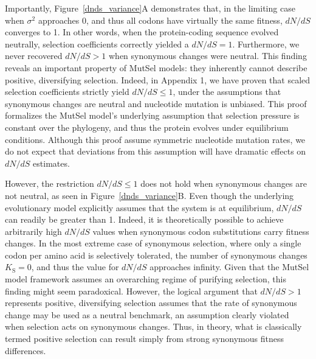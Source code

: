 \documentclass[11pt]{article}
\begin{document}
Importantly, Figure~\ref{dnds_variance}A demonstrates that, in the limiting case when $\sigma^2$ approaches 0, and thus all codons have virtually the same fitness, $dN/dS$ converges to 1. In other words, when the protein-coding sequence evolved neutrally, selection coefficients correctly yielded a $dN/dS = 1$. Furthermore, we never recovered $dN/dS > 1$ when synonymous changes were neutral. This finding reveals an important property of MutSel models: they inherently cannot describe positive, diversifying selection. Indeed, in Appendix 1, we have proven that scaled selection coefficients strictly yield $dN/dS \leq 1$, under the assumptions that synonymous changes are neutral and nucleotide mutation is unbiased. This proof formalizes the MutSel model's underlying assumption that selection pressure is constant over the phylogeny, and thus the protein evolves under equilibrium conditions. Although this proof assume symmetric nucleotide mutation rates, we do not expect that deviations from this assumption will have dramatic effects on $dN/dS$ estimates. 

However, the restriction $dN/dS \leq 1$ does not hold when synonymous changes are not neutral, as seen in Figure~\ref{dnds_variance}B. Even though the underlying evolutionary model explicitly assumes that the system is at equilibrium, $dN/dS$ can readily be greater than 1. Indeed, it is theoretically possible to achieve arbitrarily high $dN/dS$ values when synonymous codon substitutions carry fitness changes. In the most extreme case of synonymous selection, where only a single codon per amino acid is selectively tolerated, the number of synonymous changes $K_\text{S} = 0$, and thus the value for $dN/dS$ approaches infinity. Given that the MutSel model framework assumes an overarching regime of purifying selection, this finding might seem paradoxical. However, the logical argument that $dN/dS > 1$ represents positive, diversifying selection assumes that the rate of synonymous change may be used as a neutral benchmark, an assumption clearly violated when selection acts on synonymous changes. Thus, in theory, what is classically termed positive selection can result simply from strong synonymous fitness differences. 
\end{document}
